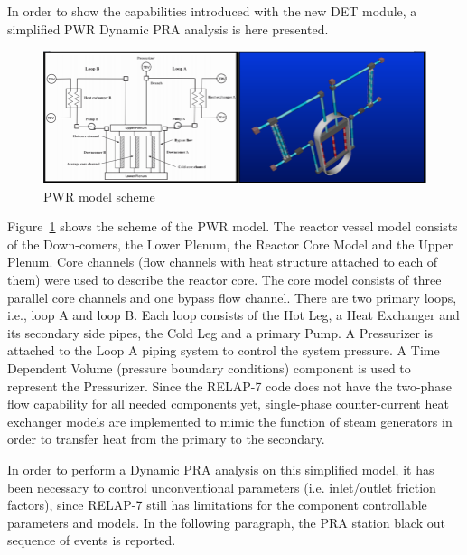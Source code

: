\label{sec:demo}
In order to show the capabilities introduced with the new DET module, a simplified PWR Dynamic PRA analysis is here presented.
\begin{figure}[h]
   \centering
    \includegraphics[width=1.0\textwidth]{figures/PWR_TMI_SCHEME.PNG}
    \caption{PWR model scheme}
    \label{fig:PWRmodel}
\end{figure}
Figure~\ref{fig:PWRmodel} shows the scheme of the PWR model. The reactor vessel model consists of the Down-comers, the Lower Plenum, the Reactor Core Model and the Upper Plenum. Core channels (flow channels with heat structure attached to each of them) were used to describe the reactor core. The core model consists of three parallel core channels and one bypass flow channel. 
There are two primary loops, i.e., loop A and loop B. Each loop consists of the Hot Leg, a Heat Exchanger and its secondary side pipes, the Cold Leg and a primary Pump. A Pressurizer is attached to the Loop A piping system to control the system pressure. A Time Dependent Volume (pressure boundary conditions) component is used to represent the Pressurizer. Since the RELAP-7 code does not have the two-phase flow capability for all needed components yet, single-phase counter-current heat exchanger models are implemented to mimic the function of steam generators in order to transfer heat from the primary to the secondary.

In order to perform a Dynamic PRA analysis on this simplified model, it has been necessary to control unconventional parameters (i.e. inlet/outlet friction factors), since RELAP-7 still has limitations for the component controllable parameters and models. In the following paragraph, the PRA station black out sequence of events is reported. 
